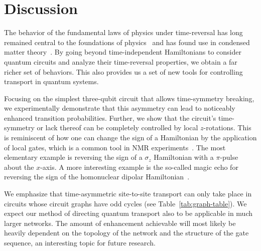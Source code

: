 \documentclass[aps,prx,10pt,
               superscriptaddress,
               twocolumn,
               longbibliography,
showpacs]{revtex4-1}
\theoremstyle{plain}
\theoremstyle{definition}
\begin{document}
\section{Discussion}
%
%

The behavior of the fundamental laws of physics under time-reversal  has long 
remained central to the foundations of
physics~\cite{wigner59,2013PhRvL.111b0504S} and has found use in condensed
matter theory~\cite{peierls1993,hofstadter1976energy,sarma2008hall,
hasan2010topological,dalibard2011artificial}.
By going beyond time-independent Hamiltonians to consider quantum circuits
and analyze their time-reversal properties, we obtain
a far richer set of behaviors.
This also provides us a set of new tools for controlling transport in quantum systems.

Focusing on the simplest three-qubit circuit that allows time-symmetry breaking, 
we experimentally demonstrate
that this asymmetry can lead to noticeably enhanced transition probabilities.
Further, we
show that the circuit's time-symmetry or
lack thereof can be completely controlled by local $z$-rotations.
This is reminiscent of how 
one can change the sign of a Hamiltonian by the application
of local gates, which is a common tool in NMR experiments~\cite{nmrreview}.
The most elementary example is reversing the sign of a $\sigma_z$ Hamiltonian with
a $\pi$-pulse about the $x$-axis.  
A more interesting example is the so-called magic echo for reversing the sign of the homonuclear 
dipolar Hamiltonian~\cite{Rhim71, cho2005multispin}. 

We emphasize that time-asymmetric site-to-site transport can only take place in circuits whose circuit graphs have odd cycles (see Table~\ref{tab:graph-table}).
We expect our method of directing quantum transport also to be
applicable in much larger networks. 
The amount of enhancement achievable  will most likely be heavily dependent 
on the topology of the network and the structure of the gate sequence,
  an interesting topic for future research.\\
\end{document}
